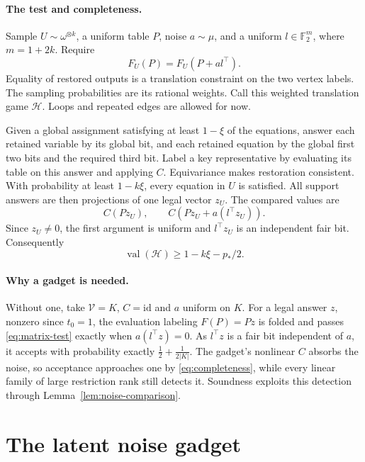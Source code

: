 \documentclass[11pt]{article}
\newcommand{\F}{\mathbb F}
\newcommand{\val}{\operatorname{val}}
\begin{document}
\paragraph{The test and completeness.}
Sample $U\sim\omega^{\otimes k}$, a uniform table $P$, noise $a\sim\mu$, and a uniform
$l\in\F_2^m$, where $m=1+2k$. Require
\begin{equation}\label{eq:matrix-test}
 F_U(P)=F_U(P+a l^\top).
\end{equation}
Equality of restored outputs is a translation constraint on the two vertex
labels. The sampling probabilities are its rational weights. Call this
weighted translation game $\mathcal H$. Loops and repeated edges are allowed
for now.

Given a global assignment satisfying at least $1-\xi$ of the equations,
answer each retained variable by its global bit, and each retained equation
by the global first two bits and the required third bit. Label a key
representative by evaluating its table on this answer and applying $C$.
Equivariance makes restoration consistent. With probability at least
$1-k\xi$, every equation in $U$ is satisfied. All support answers are then
projections of one legal vector $z_U$. The compared values are
\[
 C(Pz_U),\qquad C(Pz_U+a(l^\top z_U)).
\]
Since $z_U\ne0$, the first argument is uniform and $l^\top z_U$ is an
independent fair bit. Consequently
\begin{equation}\label{eq:completeness}
 \val(\mathcal H)\ge1-k\xi-p_*/2.
\end{equation}

\paragraph{Why a gadget is needed.}
Without one, take $\mathcal V=K$, $C=\mathrm{id}$ and $a$ uniform on $K$.
For a legal answer $z$, nonzero since $t_0=1$, the evaluation labeling
$F(P)=Pz$ is folded and passes \eqref{eq:matrix-test} exactly when
$a(l^\top z)=0$. As $l^\top z$ is a fair bit independent of $a$, it
accepts with probability exactly $\frac12+\frac1{2|K|}$. The gadget's
nonlinear $C$ absorbs the noise, so acceptance approaches one by
\eqref{eq:completeness}, while every linear family of large restriction
rank still detects it. Soundness exploits this detection through
Lemma~\ref{lem:noise-comparison}.

\section{The latent noise gadget}
\label{latent:section}
\end{document}
